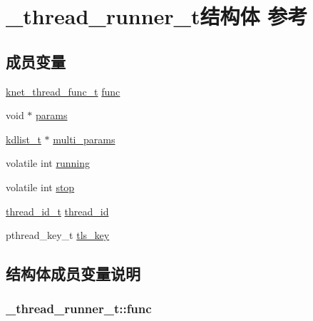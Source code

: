 \hypertarget{a00047}{}\section{\+\_\+thread\+\_\+runner\+\_\+t结构体 参考}
\label{a00047}
\subsection*{成员变量}
\begin{DoxyCompactItemize}
\item 
\hyperlink{a00066_a8741dac4a9f8d97603eb3a30a3473b13_a8741dac4a9f8d97603eb3a30a3473b13}{knet\+\_\+thread\+\_\+func\+\_\+t} \hyperlink{a00047_a1f56d29a55490e9ae7c673e07317de36_a1f56d29a55490e9ae7c673e07317de36}{func}
\item 
void $\ast$ \hyperlink{a00047_aab08f4e0fa5f6ffe16fcd3c055666c9c_aab08f4e0fa5f6ffe16fcd3c055666c9c}{params}
\item 
\hyperlink{a00066_ae098586334a621a23cef7cb17590b618_ae098586334a621a23cef7cb17590b618}{kdlist\+\_\+t} $\ast$ \hyperlink{a00047_af21668f1d89dff5046d431399d2cf7c6_af21668f1d89dff5046d431399d2cf7c6}{multi\+\_\+params}
\item 
volatile int \hyperlink{a00047_a158d37a73657b2df73e3a2dd383808f8_a158d37a73657b2df73e3a2dd383808f8}{running}
\item 
volatile int \hyperlink{a00047_a7c1ba378a7b2c1fb84967e7b4063303d_a7c1ba378a7b2c1fb84967e7b4063303d}{stop}
\item 
\hyperlink{a00066_ad0ada5642d10ce71bdd90816182f9b79_ad0ada5642d10ce71bdd90816182f9b79}{thread\+\_\+id\+\_\+t} \hyperlink{a00047_ab632944b59861e33a9473347b0afdc00_ab632944b59861e33a9473347b0afdc00}{thread\+\_\+id}
\item 
pthread\+\_\+key\+\_\+t \hyperlink{a00047_ad7461a4eef9b83e07f0acd4f26923744_ad7461a4eef9b83e07f0acd4f26923744}{tls\+\_\+key}
\end{DoxyCompactItemize}


\subsection{结构体成员变量说明}
\hypertarget{a00047_a1f56d29a55490e9ae7c673e07317de36_a1f56d29a55490e9ae7c673e07317de36}{}
\subsubsection[{func}]{ \+\_\+thread\+\_\+runner\+\_\+t\+::func}\label{a00047_a1f56d29a55490e9ae7c673e07317de36_a1f56d29a55490e9ae7c673e07317de36}
\hypertarget{a00047_af21668f1d89dff5046d431399d2cf7c6_af21668f1d89dff5046d431399d2cf7c6}{}
